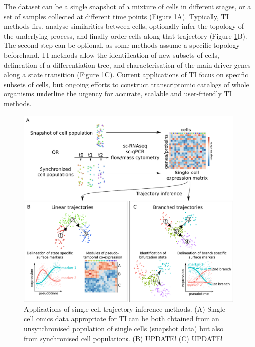 The dataset can be a single snapshot of a mixture of cells in different stages, or a set of samples collected at different time points (Figure \ref{fig:trajectory_inference}A). Typically, TI methods first analyse similarities between cells, optionally infer the topology of the underlying process, and finally order cells along that trajectory (Figure \ref{fig:trajectory_inference}B). The second step can be optional, as some methods assume a specific topology beforehand.
TI methods allow the identification of new subsets of cells, delineation of a differentiation tree, and characterisation of the main driver genes along a state transition (Figure \ref{fig:trajectory_inference}C). Current applications of TI focus on specific subsets of cells, but ongoing efforts to construct transcriptomic catalogs of whole organisms \cite{regev_humancellatlas_2017,han_mappingmousecell_2018,schaum_singlecelltranscriptomics20_2018} underline the urgency for accurate, scalable \cite{aibar_scenicsinglecellregulatory_2017,angerer_singlecellsmake_2017} and user-friendly TI methods.

\begin{figure}[htb!]
	\centering\includegraphics[width=\Largefigure]{fig/trajectory_inference_slim} %
	\caption{
		Applications of single-cell trajectory inference methods. (A) Single-cell omics data appropriate for TI can be both obtained from an unsynchronised population of single cells (snapshot data) but also from synchronised cell populations. (B) UPDATE! (C) UPDATE!
	}
	\label{fig:trajectory_inference}
\end{figure}

